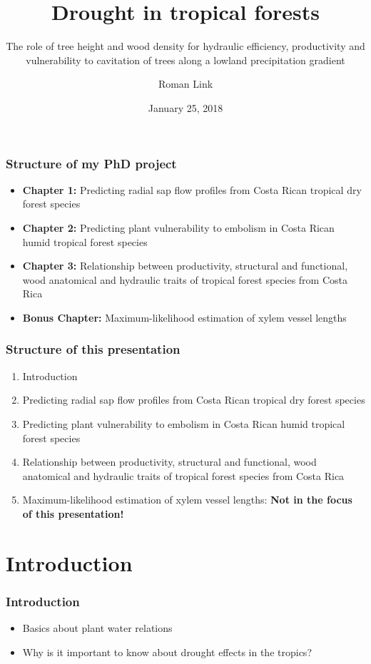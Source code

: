 \documentclass[usepdftitle=false]{beamer}
\title{Drought in tropical forests}
\subtitle{\normalfont The role of tree height and wood density for hydraulic efficiency, productivity and vulnerability to cavitation of trees along a lowland precipitation gradient}
\author[R. Link]{Roman Link}
\date{January 25, 2018}
\institute[University of Göttingen]{
Department of Plant Ecology and Ecosystem Research\\ Georg August University of Göttingen}
\newcommand{\Blue}[1]{{\color{blue!50!black}\textbf{#1}}}
\begin{document}
\begin{frame}
\titlepage
\end{frame}

\begin{frame}
	\frametitle{Structure of my PhD project}
	\begin{itemize}
		\item \Blue{Chapter 1:} Predicting radial sap flow profiles from Costa Rican tropical dry forest species
		\item \Blue{Chapter 2:} Predicting plant vulnerability to embolism in Costa Rican humid tropical forest species
		\item \Blue{Chapter 3:} Relationship between productivity, structural and functional, wood anatomical and hydraulic traits of tropical forest species from Costa Rica
		\item<visible@2> \Blue{Bonus Chapter:} Maximum-likelihood estimation of xylem vessel lengths
    \end{itemize}	
\end{frame}

\begin{frame}
	\frametitle{Structure of this presentation}
	\begin{enumerate}
		\item Introduction
		\item Predicting radial sap flow profiles from Costa Rican tropical dry forest species
		\item Predicting plant vulnerability to embolism in Costa Rican humid tropical forest species
		\item Relationship between productivity, structural and functional, wood anatomical and hydraulic traits of tropical forest species from Costa Rica
		\item<visible@2| alert@2> Maximum-likelihood estimation of xylem vessel lengths: \textbf{Not in the focus of this presentation!}
	\end{enumerate}	
\end{frame}

\section{Introduction}
\begin{frame}
	\frametitle{Introduction}
	\begin{itemize}
		\item Basics about plant water relations
		\item Why is it important to know about drought effects in the tropics?
	\end{itemize}
\end{frame}
\end{document}
